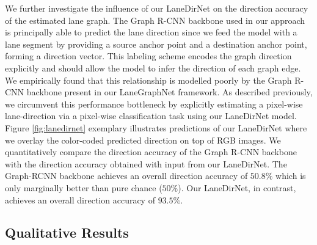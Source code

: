 \documentclass[letterpaper, 10 pt, conference]{ieeeconf}
\begin{document}
We further investigate the influence of our LaneDirNet on the direction accuracy of the estimated lane graph. The Graph R-CNN backbone \cite{yang2018graph} used in our approach is principally able to predict the lane direction since we feed the model with a lane segment by providing a source anchor point and a destination anchor point, forming a direction vector. This labeling scheme encodes the graph direction explicitly and should allow the model to infer the direction of each graph edge. We empirically found that this relationship is modelled poorly by the Graph R-CNN backbone present in our LaneGraphNet framework. As described previously, we circumvent this performance bottleneck by explicitly estimating a pixel-wise lane-direction via a pixel-wise classification task using our LaneDirNet model. Figure \ref{fig:lanedirnet} exemplary illustrates predictions of our LaneDirNet where we overlay the color-coded predicted direction on top of RGB images. We quantitatively compare the direction accuracy of the Graph R-CNN backbone with the direction accuracy obtained with input from our LaneDirNet. The Graph-RCNN backbone achieves an overall direction accuracy of $50.8\%$ which is only marginally better than pure chance ($50\%$). Our LaneDirNet, in contrast, achieves an overall direction accuracy of $93.5\%$.




\subsection{Qualitative Results}
\end{document}
